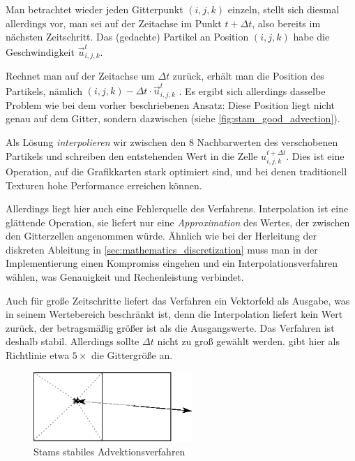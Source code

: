 Man betrachtet wieder jeden Gitterpunkt $(i,j,k)$ einzeln, stellt sich diesmal
allerdings vor, man sei auf der Zeitachse im Punkt $t+\Delta t$, also bereits im
nächsten Zeitschritt. Das (gedachte) Partikel an Position $(i,j,k)$ habe die
Geschwindigkeit $\vec{u}_{i,j,k}^t$.

Rechnet man auf der Zeitachse um $\Delta t$ zurück, erhält man die
 Position des Partikels, nämlich $(i,j,k) - \Delta t
\cdot \vec{u}_{i,j,k}^t$ . Es
ergibt sich allerdings dasselbe Problem wie bei dem vorher beschriebenen Ansatz:
Diese Position liegt nicht genau auf dem Gitter, sondern dazwischen (siehe
\autoref{fig:stam_good_advection}).

Als Lösung \emph{interpolieren} wir zwischen den 8 Nachbarwerten des
verschobenen Partikels und schreiben den entstehenden Wert in die Zelle
$u_{i,j,k}^{t+\Delta t}$. Dies ist eine Operation, auf die Grafikkarten stark
optimiert sind, und bei denen traditionell Texturen hohe Performance erreichen
können.

Allerdings liegt hier auch eine Fehlerquelle des Verfahrens. Interpolation ist
eine glättende Operation, sie liefert nur eine \emph{Approximation} des Wertes,
der zwischen den Gitterzellen angenommen würde. Ähnlich wie bei der
Herleitung der diskreten Ableitung in \autoref{sec:mathematics_discretization}
muss man in der Implementierung einen Kompromiss eingehen und ein
Interpolationsverfahren wählen, was Genauigkeit und Rechenleistung verbindet.

Auch für große Zeitschritte liefert das Verfahren ein Vektorfeld als Ausgabe,
was in seinem Wertebereich beschränkt ist, denn die Interpolation liefert kein
Wert zurück, der betragsmäßig größer ist als die Ausgangswerte. Das Verfahren
ist deshalb stabil. Allerdings sollte $\Delta t$ nicht zu groß gewählt werden.
\cite{Foster} gibt hier als Richtlinie etwa $5\times$ die Gittergröße an.

\begin{figure}[ht]
\centering
\includegraphics[width=6cm]{images/advection_good}
\caption{Stams stabiles Advektionsverfahren}
\label{fig:stam_good_advection}
\end{figure}

